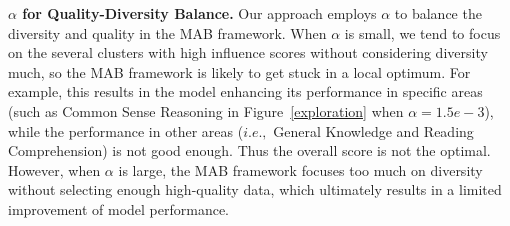 \documentclass{article} %
\begin{document}
\textbf{$\alpha$ for Quality-Diversity Balance.}
Our approach employs $\alpha$ to balance the diversity and quality in the MAB framework.  
%
When $\alpha$ is small, we tend to focus on the several clusters with high influence scores without considering diversity much, so the MAB framework is likely to get stuck in a local optimum. 
%
For example, this results in the model enhancing its performance in specific areas (such as Common Sense Reasoning in Figure~\ref{exploration} when $\alpha = 1.5e-3$), while the performance in other areas ($i.e.,$ General Knowledge and Reading Comprehension) is not good enough. Thus the overall score is not the optimal. 
%
However, when $\alpha$ is large, the MAB framework focuses too much on diversity without selecting enough high-quality data, which ultimately results in a limited improvement of model performance.
\end{document}
